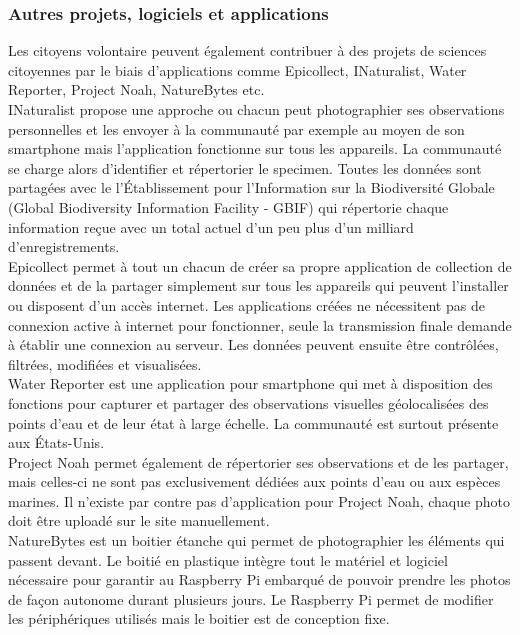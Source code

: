 \documentclass[10pt, conference, compsocconf]{llncs}
\begin{document}
		\subsubsection{Autres projets, logiciels et applications}
			Les citoyens volontaire peuvent également contribuer à des projets de sciences citoyennes par le biais d'applications comme Epicollect, INaturalist, Water Reporter, Project Noah, NatureBytes etc.\\
			INaturalist propose une approche ou chacun peut photographier ses observations personnelles et les envoyer à la communauté par exemple au moyen de son smartphone mais l'application fonctionne sur tous les appareils. La communauté se charge alors d'identifier et répertorier le specimen. Toutes les données sont partagées avec le l'Établissement pour l'Information sur la Biodiversité Globale (Global Biodiversity Information Facility - GBIF) qui répertorie chaque information reçue avec un total actuel d'un peu plus d'un milliard d'enregistrements.\\
			Epicollect permet à tout un chacun de créer sa propre application de collection de données et de la partager simplement sur tous les appareils qui peuvent l'installer ou disposent d'un accès internet. Les applications créées ne nécessitent pas de connexion active à internet pour fonctionner, seule la transmission finale demande à établir une connexion au serveur. Les données peuvent ensuite être contrôlées, filtrées, modifiées et visualisées. \\
			Water Reporter est une application pour smartphone qui met à disposition des fonctions pour capturer et partager des observations visuelles géolocalisées des points d'eau et de leur état à large échelle. La communauté est surtout présente aux États-Unis.\\
			Project Noah permet également de répertorier ses observations et de les partager, mais celles-ci ne sont pas exclusivement dédiées aux points d'eau ou aux espèces marines. Il n'existe par contre pas d'application pour Project Noah, chaque photo doit être uploadé sur le site manuellement.\\
			NatureBytes est un boitier  étanche qui permet de photographier les éléments qui passent devant. Le boitié en plastique intègre tout le matériel et logiciel nécessaire pour garantir au Raspberry Pi embarqué de pouvoir prendre les photos de façon autonome durant plusieurs jours. Le Raspberry Pi permet de modifier les périphériques utilisés mais le boitier est de conception fixe. 
		
\end{document}
